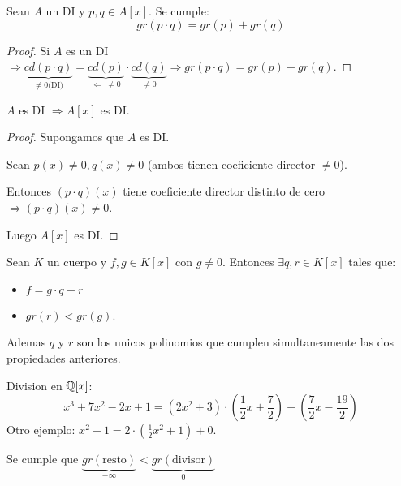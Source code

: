 \vspace{0.2cm}
\begin{proposition}
	Sean \(A \) un DI y \(p,q \in A[x ]\). Se cumple:
	\[
		gr(p \cdot q) = gr(p) + gr(q )
	\]
\end{proposition}
\begin{proof}
	Si \(A \) es un DI \(\Rightarrow \underbrace{cd(p \cdot q)}_{\neq 0 \text{(DI)} } = \underbrace{cd(p)}_{\Leftarrow\; \neq 0} \cdot \underbrace{cd(q)}_{\neq 0} \Rightarrow gr(p \cdot q) = gr(p) + gr(q)\).
\end{proof}
\begin{corollary}
	\(A \) es DI \(\Rightarrow A[x ]\) es DI.
\end{corollary}
\begin{proof}
	Supongamos que \(A \) es DI.
	
	Sean \(p(x) \neq 0, q(x) \neq 0 \) (ambos tienen coeficiente director \(\neq  0 \)).
	
	Entonces \((p \cdot q)(x) \) tiene coeficiente director distinto de cero \(\Rightarrow (p \cdot q)(x) \neq 0 \).
	
	Luego \(A[x ]\) es DI.
	
\end{proof}
\begin{theorem}
	Sean \(K \) un cuerpo y \(f,g \in K[x ]\) con \(g \neq 0 \). Entonces \(\exists q,r \in K[x ]\) tales que:
	\begin{itemize}
		\item \(f = g \cdot q + r \)
		\item \(gr(r) < gr(g )\).
	\end{itemize}
	Ademas \(q \) y \(r \) son los unicos polinomios que cumplen simultaneamente las dos propiedades anteriores.
\end{theorem}
\begin{example}
	Division en \(\mathbb{Q}[x ]\):
	\[
		x^{3 } + 7x^{2} - 2x + 1 = (2x^{2}  +3 ) \cdot (\frac{1}{2}x + \frac{7}{2}) + (\frac{7}{2}x - \frac{19}{2 })
	\]
	Otro ejemplo:
	\(x^{2} + 1 = 2 \cdot (\frac{1}{2}x^{2} + 1 ) + 0 \).
	
	Se cumple que \(\underbrace{gr(\text{resto} )}_{-\infty} < \underbrace{gr(\text{divisor} )}_{0}\)
\end{example}



